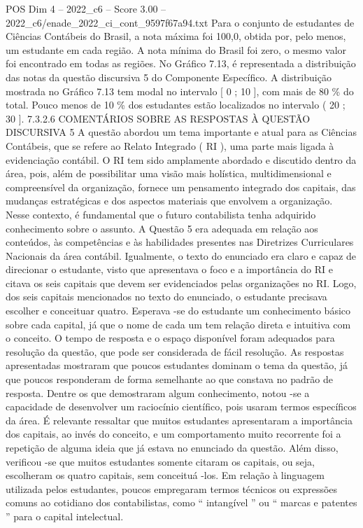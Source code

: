 \begin{textsample}{POS Dim 4 – 2022\_c6 – Score 3.00 – 2022\_c6/enade\_2022\_ci\_cont\_9597f67a94.txt}
Para o conjunto de estudantes de Ciências Contábeis do Brasil, a nota máxima foi 100,0, obtida por, pelo menos, um estudante em cada região.
A nota mínima do Brasil foi zero, o mesmo valor foi encontrado em todas as regiões.
No Gráfico 7.13, é representada a distribuição das notas da questão discursiva 5 do Componente Específico.
A distribuição mostrada no Gráfico 7.13 tem modal no intervalo [ 0 ; 10 ], com mais de 80 \% do total.
Pouco menos de 10 \% dos estudantes estão localizados no intervalo ( 20 ; 30 ]. 7.3.2.6 COMENTÁRIOS SOBRE AS RESPOSTAS À QUESTÃO DISCURSIVA 5 A questão abordou um tema importante e atual para as Ciências Contábeis, que se refere ao Relato Integrado ( RI ), uma parte mais ligada à evidenciação contábil.
O RI tem sido amplamente abordado e discutido dentro da área, pois, além de possibilitar uma visão mais holística, multidimensional e compreensível da organização, fornece um pensamento integrado dos capitais, das mudanças estratégicas e dos aspectos materiais que envolvem a organização.
Nesse contexto, é fundamental que o futuro contabilista tenha adquirido conhecimento sobre o assunto.
A Questão 5 era adequada em relação aos conteúdos, às competências e às habilidades presentes nas Diretrizes Curriculares Nacionais da área contábil.
Igualmente, o texto do enunciado era claro e capaz de direcionar o estudante, visto que apresentava o foco e a importância do RI e citava os seis capitais que devem ser evidenciados pelas organizações no RI.
Logo, dos seis capitais mencionados no texto do enunciado, o estudante precisava escolher e conceituar quatro.
Esperava -se do estudante um conhecimento básico sobre cada capital, já que o nome de cada um tem relação direta e intuitiva com o conceito.
O tempo de resposta e o espaço disponível foram adequados para resolução da questão, que pode ser considerada de fácil resolução.
As respostas apresentadas mostraram que poucos estudantes dominam o tema da questão, já que poucos responderam de forma semelhante ao que constava no padrão de resposta.
Dentre os que demostraram algum conhecimento, notou -se a capacidade de desenvolver um raciocínio científico, pois usaram termos específicos da área.
É relevante ressaltar que muitos estudantes apresentaram a importância dos capitais, ao invés do conceito, e um comportamento muito recorrente foi a repetição de alguma ideia que já estava no enunciado da questão.
Além disso, verificou -se que muitos estudantes somente citaram os capitais, ou seja, escolheram os quatro capitais, sem conceituá -los.
Em relação à linguagem utilizada pelos estudantes, poucos empregaram termos técnicos ou expressões comuns ao cotidiano dos contabilistas, como “ intangível ” ou “ marcas e patentes ” para o capital intelectual.

\end{textsample}
